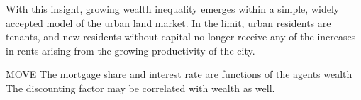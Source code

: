 With this insight, growing wealth inequality emerges within a simple, widely accepted model of the urban land market. In the limit, urban residents are tenants, and new residents without capital no longer receive any of the increases in rents arising from the growing productivity of the city. 



MOVE The mortgage share and interest rate are functions of the agents wealth %
The discounting factor may be correlated with wealth as well. 

